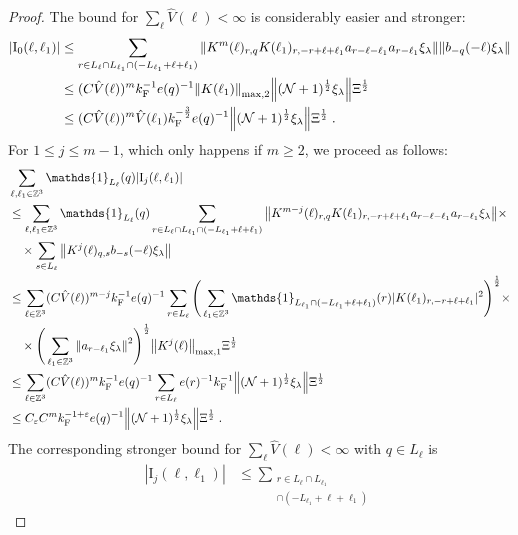 \documentclass[12pt,a4paper]{article}
\numberwithin{equation}{section}
\newcommand{\1}{\mathbb{I}}
\newcommand{\F}{\mathrm{F}}
\newcommand{\I}{\mathrm{I}}
\newcommand{\kF}{k_\F}
\newcommand{\Zstar}{\mathbb{Z}^3} %
\newcommand{\Z}{\mathbb{Z}}
\newcommand{\NN}{\mathcal{N}}
\newcommand{\half}{\frac{1}{2}}
\theoremstyle{plain}
\theoremstyle{definition}
\theoremstyle{remark}
\theoremstyle{plain}
\theoremstyle{definition}
\theoremstyle{remark}
\begin{document}
\begin{proof}
The bound for $ \sum_{\ell} \hat{V}(\ell) < \infty $ is considerably easier and stronger:
\begin{align}
	|\I_0(\ell, \ell_1)|
	&\leq \sum_{r\in L_{\ell} \cap L_{\ell_1} \cap (-L_{\ell_1}+\ell+\ell_1)} \norm{K^m(\ell)_{r,q} K(\ell_1)_{r,-r+\ell+\ell_1} a_{r-\ell-\ell_1} a_{r-\ell_1} \xi_\lambda}\norm{ b_{-q}(-\ell) \xi_\lambda}\nonumber\\
	&\leq (C \hat{V}(\ell))^m \kF^{-1} e(q)^{-1}
		\norm{K(\ell_1)}_{\max,2} \norm{ (\NN+1)^\half \xi_\lambda } \Xi^{\half} \nonumber\\
	&\leq (C \hat{V}(\ell))^m
		\hat{V}(\ell_1)
		\kF^{-\frac 32} e(q)^{-1}
		\norm{ (\NN+1)^\half \xi_\lambda } \Xi^{\half} \;. \label{eq:estEQ2151}
\end{align}
For $ 1 \le j \le m-1 $, which only happens if $ m \ge 2 $, we proceed as follows:
\begin{align}
	&\sum_{\ell,\ell_1 \in \Zstar} \mathds{1}_{L_\ell}(q) |\I_j(\ell, \ell_1)| \nonumber\\
	&\leq \sum_{\ell,\ell_1 \in \Zstar} \mathds{1}_{L_\ell}(q) \sum\limits_{r\in L_{\ell} \cap L_{\ell_1} \cap (-L_{\ell_1}+\ell+\ell_1)}
		\norm{ K^{m-j}(\ell)_{r,q} K(\ell_1)_{r,-r+\ell+\ell_1} a_{r-\ell-\ell_1} a_{r-\ell_1} \xi_\lambda} \times \nonumber\\
	&\quad \times \sum\limits_{s \in L_{\ell}}
		\norm{ K^j(\ell)_{q,s} b_{-s}(-\ell) \xi_\lambda }\nonumber\\
	&\leq \sum_{\ell \in \Zstar} (C \hat{V}(\ell))^{m-j} \kF^{-1} e(q)^{-1}
		\sum_{r \in L_\ell}
		\Bigg( \sum_{\ell_1 \in \Zstar} \mathds{1}_{L_{\ell_1} \cap (-L_{\ell_1}+\ell+\ell_1) }(r) |K(\ell_1)_{r,-r+\ell+\ell_1}|^2 \Bigg)^{\half} \times \nonumber\\
	&\quad \times \Bigg( \sum_{\ell_1 \in \Z^3} \norm{ a_{r-\ell_1} \xi_\lambda}^2 \Bigg)^{\half}
		\norm{K^j(\ell)}_{\max,1}
		\Xi^\half \nonumber\\
	&\leq \sum_{\ell \in \Zstar} (C \hat{V}(\ell))^m \kF^{-1} e(q)^{-1}
		\sum_{r \in L_\ell} e(r)^{-1} \kF^{-1}
		\norm{ (\NN+1)^{\half} \xi_\lambda}
		\Xi^\half \nonumber\\
	&\leq C_\varepsilon C^m \kF^{-1+\varepsilon} e(q)^{-1}
		\norm{ (\NN+1)^{\half} \xi_\lambda}
		\Xi^\half \;. \label{eq:estEQ2152_Coulomb}
\end{align}
The corresponding stronger bound for $ \sum_\ell \hat{V}(\ell) < \infty $ with $ q \in L_\ell $ is
\begin{align}
	|\I_j(\ell, \ell_1)|
	&\leq \sum_{\substack{r\in L_{\ell} \cap L_{\ell_1}\\ \cap (-L_{\ell_1}+\ell+\ell_1)}}

\end{align}
\end{proof}
\end{document}
